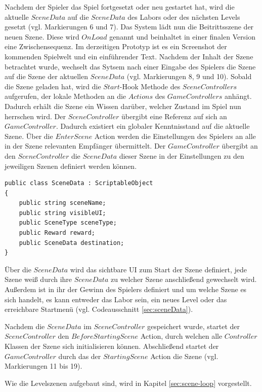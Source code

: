 Nachdem der Spieler das Spiel fortgesetzt oder neu gestartet hat, wird die aktuelle $SceneData$ auf die $SceneData$ des Labors oder des nächsten Levels gesetzt (vgl. Markierungen 6 und 7). Das System lädt nun die Beitrittsszene der neuen Szene. Diese wird $OnLoad$ genannt und beinhaltet in einer finalen Version eine Zwischensequenz. Im derzeitigen Prototyp ist es ein Screenshot der kommenden Spielwelt und ein einführender Text. Nachdem der Inhalt der Szene betrachtet wurde, wechselt das Sytsem nach einer Eingabe des Spielers die Szene auf die Szene der aktuellen $SceneData$ (vgl. Markierungen 8, 9 und 10). Sobald die Szene geladen hat, wird die $Start$-Hook Methode des $SceneControllers$ aufgerufen, der lokale Methoden an die $Actions$ des $GameControllers$ anhängt. Dadurch erhält die Szene ein Wissen darüber, welcher Zustand im Spiel nun herrschen wird. Der $SceneController$ übergibt eine Referenz auf sich an $GameController$. Dadurch existiert ein globaler Kenntnisstand auf die aktuelle Szene. Über die $EnterScene$ Action werden die Einstellungen des Spielers an alle in der Szene relevanten Empfänger übermittelt. Der $GameController$ übergibt an den $SceneController$ die $SceneData$ dieser Szene in der Einstellungen zu den jeweiligen Szenen definiert werden können.

\begin{lstlisting}[caption={SceneData.ts}, label={sec:sceneData}]
public class SceneData : ScriptableObject
{
    public string sceneName;
    public string visibleUI;
    public SceneType sceneType;
    public Reward reward;
    public SceneData destination;
}
\end{lstlisting}

Über die $SceneData$ wird das sichtbare \ac{UI} zum Start der Szene definiert, jede Szene weiß durch ihre $SceneData$ zu welcher Szene anschließend gewechselt wird. Außerdem ist in ihr der Gewinn des Spielers definiert und um welche Szene es sich handelt, es kann entweder das Labor sein, ein neues Level oder das erreichbare Startmenü (vgl. Codeausschnitt \ref{sec:sceneData}).

Nachdem die $SceneData$ im $SceneController$ gespeichert wurde, startet der\\ $SceneController$ den $BeforeStartingScene$ Action, durch welchen alle $Controller$ Klassen der Szene sich initialisieren können. Abschließend startet der $GameController$ durch das  der $StartingScene$ Action die Szene (vgl. Markierungen 11 bis 19). 

Wie die Levelszenen aufgebaut sind, wird in Kapitel \ref{sec:scene-loop}  vorgestellt.

